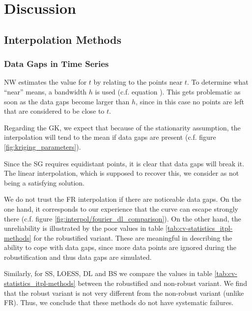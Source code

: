 \chapter{Discussion}


\section{Interpolation Methods}{ \label{sec:discussion_itpl}
    \subsection{Data Gaps in Time Series}\label{sec:discussion_itpl_data_gaps}{
        NW estimates the value for $t$ by relating to the points near $t$. To determine what ``near'' means, a bandwidth $h$ is used (c.f. equation ). This gets problematic as soon as the data gaps become larger than $h$, since in this case no points are left that are considered to be close to $t$. 

        Regarding the GK, we expect that because of the stationarity assumption, the interpolation will tend to the mean if data gaps are present (c.f. figure \ref{fig:kriging_parameters}). 

        Since the SG requires equidistant points, it is clear that data gaps will break it. The linear interpolation, which is supposed to recover this, we consider as not being a satisfying solution.

        We do not trust the FR interpolation if there are noticeable data gaps. On the one hand, it corresponds to our experience that the curve can escape strongly there (c.f. figure \ref{fig:interpol/fourier_dl_comparison}). On the other hand, the unreliability is illustrated by the poor values in table \ref{tab:cv-statistics_itpl-methods} for the robustified variant. These are meaningful in describing the ability to cope with data gaps, since more data points are ignored during the robustification and thus data gaps are simulated. 

        Similarly, for SS, LOESS, DL and BS we compare the values in table \ref{tab:cv-statistics_itpl-methods} between the robustified and non-robust variant. We find that the robust variant is not very different from the non-robust variant (unlike FR). Thus, we conclude that these methods do not have systematic failures.

}}
